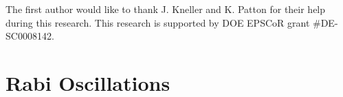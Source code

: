 \documentclass[%
reprint,
 amsmath,amssymb,
 prd,
]{revtex4-1}
\begin{document}
The first author would like to thank J. Kneller and K. Patton for their help during this research. This research is supported by DOE EPSCoR grant \#DE-SC0008142.









\appendix


\section{\label{sec:rabi-oscillations}Rabi Oscillations}

\end{document}
